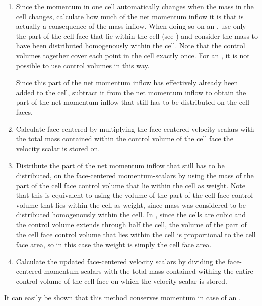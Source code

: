 \begin{enumerate}
    \item Since the momentum in one cell automatically changes when the mass in the cell changes, calculate how much of the net momentum inflow it is that is actually a consequence of the mass inflow. When doing so on an , use only the part of the cell face  that lie within the cell (see ) and consider the mass to have been distributed homogenously within the cell. Note that the control volumes together cover each point in the cell exactly once. For an , it is not possible to use control volumes in this way.
    
    Since this part of the net momentum inflow has effectively already heen added to the cell, subtract it from the net momentum inflow to obtain the part of the net momentum inflow that still has to be distributed on the cell faces.
    
    \item Calculate face-centered  by multiplying the face-cen\-tered velocity scalars with the total mass contained within the control volume of the cell face the velocity scalar is stored on.
    
    \item Distribute the part of the net momentum inflow that still has to be distributed, on the face-centered momentum-scalars by using the mass of the part of the cell face control volume that lie within the cell as weight. Note that this is equivalent to using the volume of the part of the cell face control volume that lies within the cell as weight, since mass was considered to be distributed homogenously within the cell. In \thisprojectwork, since the cells are cubic and the control volume extends through half the cell, the volume of the part of the cell face control volume that lies within the cell is proportional to the cell face area, so in this case the weight is simply the cell face area.
    
    \item Calculate the updated face-centered velocity scalars by dividing the face-centered momentum scalars with the total mass contained withing the entire control volume of the cell face on which the velocity scalar is stored.
\end{enumerate}

It can easily be shown that this method conserves momentum in case of an .